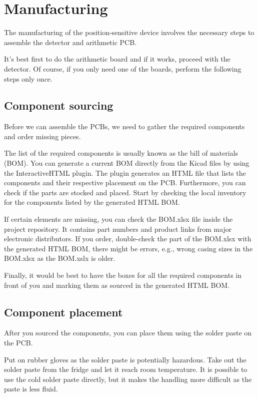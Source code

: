 \section{Manufacturing}

The manufacturing of the position-sensitive device involves the necessary steps to assemble the detector and arithmetic PCB.

It's best first to do the arithmetic board and if it works, proceed with the detector. Of course, if you only need one of the boards, perform the following steps only once.

\subsection{Component sourcing}

Before we can assemble the PCBs, we need to gather the required components and order missing pieces.

The list of the required components is usually known as the bill of materials (BOM). You can generate a current BOM directly from the Kicad files by using the InteractiveHTML plugin. The plugin generates an HTML file that lists the components and their respective placement on the PCB. Furthermore, you can check if the parts are stocked and placed. Start by checking the local inventory for the components listed by the generated HTML BOM.

If certain elements are missing, you can check the BOM.xlsx file inside the project repository. It contains part numbers and product links from major electronic distributors. If you order, double-check the part of the BOM.xlsx with the generated HTML BOM, there might be errors, e.g., wrong casing sizes in the BOM.xlsx as the BOM.xslx is older.

Finally, it would be best to have the boxes for all the required components in front of you and marking them as sourced in the generated HTML BOM.

\subsection{Component placement}

After you sourced the components, you can place them using the solder paste on the PCB.

Put on rubber gloves as the solder paste is potentially hazardous. Take out the solder paste from the fridge and let it reach room temperature. It is possible to use the cold solder paste directly, but it makes the handling more difficult as the paste is less fluid.

